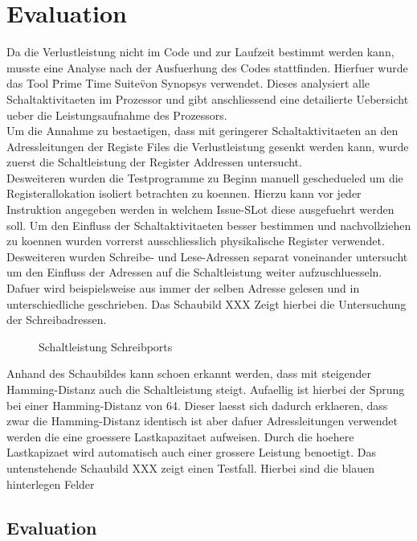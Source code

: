\chapter{Evaluation}
\label{chap:evaluation}
Da die Verlustleistung nicht im Code und zur Laufzeit bestimmt werden kann, musste eine Analyse nach der Ausfuerhung des Codes stattfinden. Hierfuer wurde das Tool \"Prime Time Suite\" von Synopsys verwendet. Dieses analysiert alle Schaltaktivitaeten im Prozessor und gibt anschliessend eine detailierte Uebersicht ueber die Leistungsaufnahme des Prozessors.\\
Um die Annahme zu bestaetigen, dass mit geringerer Schaltaktivitaeten an den Adressleitungen der Registe Files die Verlustleistung gesenkt werden kann, wurde zuerst die Schaltleistung der Register Addressen untersucht.\\
Desweiteren wurden die Testprogramme zu Beginn manuell geschedueled um die Registerallokation isoliert betrachten zu koennen. Hierzu kann vor jeder Instruktion angegeben werden in welchem Issue-SLot diese ausgefuehrt werden soll. Um den Einfluss der Schaltaktivitaeten besser bestimmen und nachvollziehen zu koennen wurden vorrerst ausschliesslich physikalische Register verwendet. \\
Desweiteren wurden Schreibe- und Lese-Adressen separat voneinander untersucht um den Einfluss der Adressen auf die Schaltleistung weiter aufzuschluesseln. Dafuer wird beispielsweise aus immer der selben Adresse gelesen und in unterschiedliche geschrieben. Das Schaubild XXX Zeigt hierbei die Untersuchung der Schreibadressen.

\begin{figure}
	\centering
	
	\caption{Schaltleistung Schreibports}
\end{figure}
Anhand des Schaubildes kann schoen erkannt werden, dass mit steigender Hamming-Distanz auch die Schaltleistung steigt. Aufaellig ist hierbei der Sprung bei einer Hamming-Distanz von 64. Dieser laesst sich dadurch erklaeren, dass zwar die Hamming-Distanz identisch ist aber dafuer Adressleitungen verwendet werden die eine groessere Lastkapazitaet aufweisen. Durch die hoehere Lastkapizaet wird automatisch auch einer grossere Leistung benoetigt.
Das untenstehende Schaubild XXX zeigt einen Testfall. Hierbei sind die blauen hinterlegen Felder 

\section{Evaluation}
\label{sec:evalutation_verification}